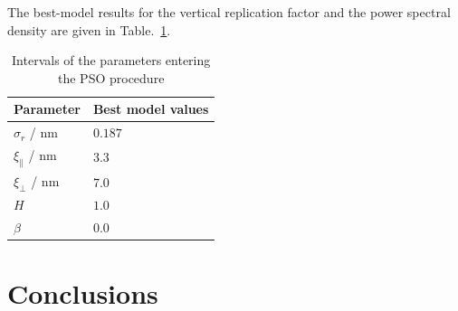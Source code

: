 The best-model results for the vertical replication factor and the power spectral density are given in Table.~\ref{tbl:psd_results}.

\begin{table}
\centering
\caption{Intervals of the parameters entering the PSO procedure}
\label{tbl:psd_results}
\begin{tabular}{@{}ll@{}}
\toprule
Parameter & Best model values\\ \midrule
$\sigma_r$ / nm & $0.187$ \\
$\xi_\parallel$ / nm& $3.3$ \\
$\xi_\perp$  / nm& $7.0$ \\
$H$ & $1.0$ \\
$\beta$ & $0.0$ \\
 \bottomrule
\end{tabular}
\end{table}

\section{Conclusions}

